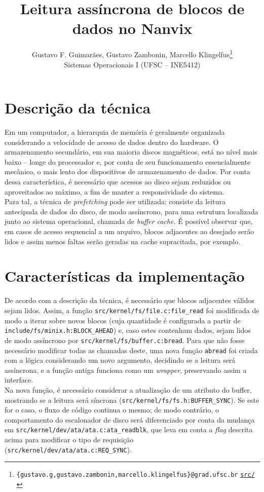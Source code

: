 \documentclass[12pt]{article}
\title{\textbf{Leitura assíncrona de blocos de dados no Nanvix}}
\author{
  Gustavo F. Guimarães, Gustavo Zambonin, Marcello Klingelfus\thanks{
    \texttt{\{gustavo.g,gustavo.zambonin,marcello.klingelfus\}@grad.ufsc.br}
    \hfill \texttt{\href{https://github.com/zambonin/nanvix}{src/}}
  } \\
  \small{Sistemas Operacionais I (UFSC -- INE5412)}
}
\date{}
\begin{document}
\maketitle

\section{Descrição da técnica}

Em um computador, a hierarquia de memória é geralmente organizada considerando
a velocidade de acesso de dados dentro do hardware. O armazenamento secundário,
em sua maioria discos magnéticos, está no nível mais baixo -- longe do
processador e, por conta de seu funcionamento essencialmente mecânico, o mais
lento dos dispositivos de armazenamento de dados. Por conta dessa
característica, é necessário que acessos ao disco sejam reduzidos ou
aproveitados ao máximo, a fim de manter a responsividade do sistema. \\

Para tal, a técnica de \emph{prefetching} pode ser utilizada: consiste da
leitura antecipada de dados do disco, de modo assíncrono, para uma estrutura
localizada junto ao sistema operacional, chamada de \emph{buffer cache}. É
possível observar que, em casos de acesso sequencial a um arquivo, blocos
adjacentes ao desejado serão lidos e assim menos faltas serão geradas na cache
supracitada, por exemplo.

\section{Características da implementação}

De acordo com a descrição da técnica, é necessário que blocos adjacentes
válidos sejam lidos. Assim, a função \texttt{src/kernel/fs/file.c:file\_read}
foi modificada de modo a iterar sobre novos blocos (cuja quantidade é
configurada a partir de \texttt{include/fs/minix.h:BLOCK\_AHEAD}) e, caso estes
contenham dados, sejam lidos de modo assíncrono por
\texttt{src/kernel/fs/buffer.c:bread}. Para que não fosse necessário modificar
todas as chamadas deste, uma nova função \texttt{abread} foi criada com a
lõgica considerando um novo argumento, decidindo se a leitura será assíncrona,
e a função antiga funciona como um \emph{wrapper}, preservando assim a
interface. \\

Na nova função, é necessário considerar a atualização de um atributo
do buffer, mostrando se a leitura será síncrona
(\texttt{src/kernel/fs/fs.h:BUFFER\_SYNC}). Se este for o caso, o fluxo de
código continua o mesmo; de modo contrário, o comportamento do escalonador de
disco será diferenciado por conta da mudança em
\texttt{src/kernel/dev/ata/ata.c:ata\_readblk}, que leva em conta a \emph{flag}
descrita acima para modificar o tipo de requisição
(\texttt{src/kernel/dev/ata/ata.c:REQ\_SYNC}).
\end{document}
